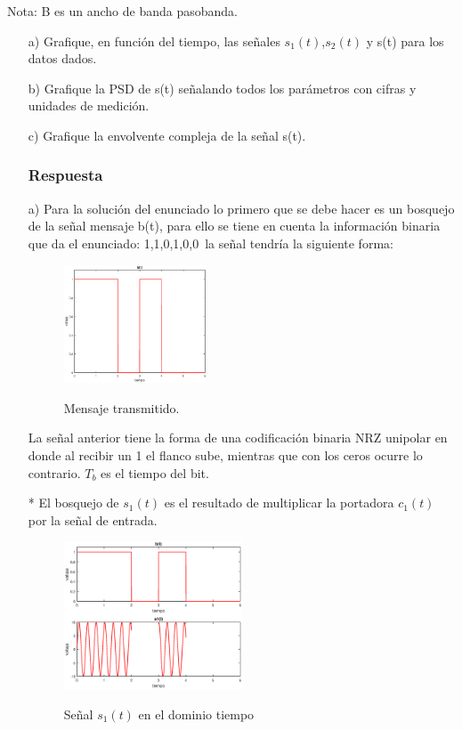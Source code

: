 Nota: B es un ancho de banda pasobanda.
\begin{itemize}


 \item[a)] Grafique, en funci\'on del tiempo, las se\~nales $s_{1}(t)$,$ s_{2}(t)$ y s(t) para los datos dados. 
 
\item[b)] Grafique la PSD de s(t) se\~nalando todos los par\'ametros con cifras y unidades de medici\'on.
\item[c)] Grafique la envolvente compleja de la se\~nal s(t).
\subsubsection{Respuesta}
 \item[a)]  
Para la soluci\'on del enunciado lo primero que se debe hacer es un bosquejo de la se\~nal mensaje b(t), para ello se tiene en cuenta la informaci\'on binaria que da el enunciado: 1,1,0,1,0,0\
la se\~nal tendr\'ia la siguiente forma:

\vspace{20px}
 \begin{figure}[h!]
	\captionsetup{justification = raggedright, singlelinecheck = false}
    \caption{Mensaje transmitido.}
    \centering
    \includegraphics[width=0.4\textwidth]{Imagenes/2.eps}
    \label{fig:mensajetrans}
\end{figure}

La se\~nal anterior tiene la forma de una codificaci\'on binaria NRZ unipolar en donde al recibir un 1 el flanco sube, mientras que con los ceros ocurre lo contrario. $T_{b}$ es el tiempo del bit.
\
 \item[*]El bosquejo de $s_{1}(t)$  es el resultado de multiplicar la portadora $c_{1}(t)$ por la se\~nal de entrada.

 \begin{figure}[h!]
	\captionsetup{justification = raggedright, singlelinecheck = false}
    \caption{Se\~nal $s_{1}(t)$ en el dominio tiempo }
    \centering
    \includegraphics[width=0.5\textwidth]{Imagenes/3.eps}
    \label{fig:dominiotiempo}
\end{figure}



\end{itemize}
